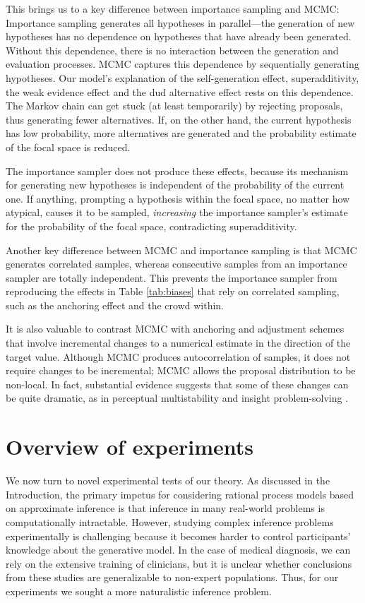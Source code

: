 This brings us to a key difference between importance sampling and MCMC: Importance sampling generates all hypotheses in parallel---the generation of new hypotheses has no dependence on hypotheses that have already been generated. Without this dependence, there is no interaction between the generation and evaluation processes. MCMC captures this dependence by sequentially generating hypotheses. Our model's explanation of the self-generation effect, superadditivity, the weak evidence effect and the dud alternative effect rests on this dependence. The Markov chain can get stuck (at least temporarily) by rejecting proposals, thus generating fewer alternatives. If, on the other hand, the current hypothesis has low probability, more alternatives are generated and the probability estimate of the focal space is reduced.

The importance sampler does not produce these effects, because its mechanism for generating new hypotheses is independent of the probability of the current one. If anything, prompting a hypothesis within the focal space, no matter how atypical, causes it to be sampled, \textit{increasing} the importance sampler's estimate for the probability of the focal space, contradicting superadditivity.

Another key difference between MCMC and importance sampling is that MCMC generates correlated samples, whereas consecutive samples from an importance sampler are totally independent. This prevents the importance sampler from reproducing the effects in Table \ref{tab:biases} that rely on correlated sampling, such as the anchoring effect and the crowd within.

It is also valuable to contrast MCMC with anchoring and adjustment schemes that involve incremental changes to a numerical estimate in the direction of the target value. Although MCMC produces autocorrelation of samples, it does not require changes to be incremental; MCMC allows the proposal distribution to be non-local. In fact, substantial evidence suggests that some of these changes can be quite dramatic, as in perceptual multistability \citep{Gershman2012} and insight problem-solving \citep{sternberg95}. 

\section{Overview of experiments}

We now turn to novel experimental tests of our theory. As discussed in the Introduction, the primary impetus for considering rational process models based on approximate inference is that inference in many real-world problems is computationally intractable. However, studying complex inference problems experimentally is challenging because it becomes harder to control participants' knowledge about the generative model. In the case of medical diagnosis, we can rely on the extensive training of clinicians, but it is unclear whether conclusions from these studies are generalizable to non-expert populations. Thus, for our experiments we sought a more naturalistic inference problem.

